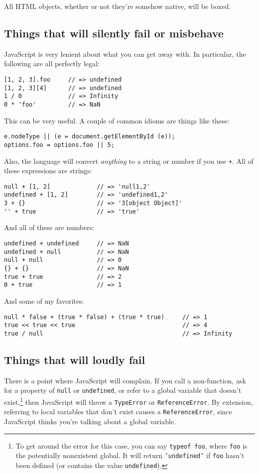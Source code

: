 \documentclass{article}
\begin{document}
    All HTML objects, whether or not they're somehow native, will be boxed.

\subsection {Things that will silently fail or misbehave}
    JavaScript is very lenient about what you can get away with. In particular, the following are all perfectly legal:

\begin{verbatim}
[1, 2, 3].foo     // => undefined
[1, 2, 3][4]      // => undefined
1 / 0             // => Infinity
0 * 'foo'         // => NaN
\end{verbatim}

    This can be very useful. A couple of common idioms are things like these:

\begin{verbatim}
e.nodeType || (e = document.getElementById (e));
options.foo = options.foo || 5;
\end{verbatim}

    Also, the language will convert {\it anything} to a string or number if you use \verb|+|. All of these expressions are strings:

\begin{verbatim}
null + [1, 2]             // => 'null1,2'
undefined + [1, 2]        // => 'undefined1,2'
3 + {}                    // => '3[object Object]'
'' + true                 // => 'true'
\end{verbatim}

    And all of these are numbers:

\begin{verbatim}
undefined + undefined     // => NaN
undefined + null          // => NaN
null + null               // => 0
{} + {}                   // => NaN
true + true               // => 2
0 + true                  // => 1
\end{verbatim}

    And some of my favorites:

\begin{verbatim}
null * false + (true * false) + (true * true)     // => 1
true << true << true                              // => 4
true / null                                       // => Infinity
\end{verbatim}

\subsection {Things that will loudly fail}
    There is a point where JavaScript will complain. If you call a non-function, ask for a property of \verb|null| or \verb|undefined|, or refer to a global variable that doesn't
    exist,\footnote{To get around the error for this case, you can say {\tt typeof foo}, where {\tt foo} is the potentially nonexistent global. It will return {\tt 'undefined'} if
    {\tt foo} hasn't been defined (or contains the value {\tt undefined}).} then JavaScript will throw a \verb|TypeError| or \verb|ReferenceError|. By extension, referring to local variables
    that don't exist causes a \verb|ReferenceError|, since JavaScript thinks you're talking about a global variable.
\end{document}
